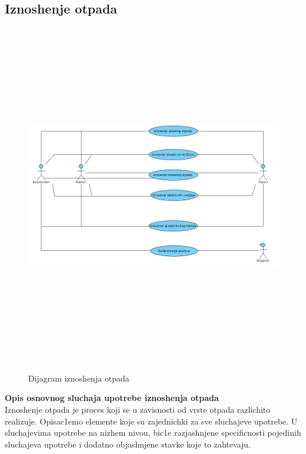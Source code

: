 \documentclass[10 pt]{article}
\begin{document}
	
	\subsection{Iznoshenje otpada}
	
	\begin{figure}[H]
		\centering
		\includegraphics[width=15cm,height=15cm,keepaspectratio]{slike/UCIznosenjeSmeca.png}\\
		\caption{Dijagram iznoshenja otpada}
	\end{figure}
	
	\textbf{Opis osnovnog sluchaja upotrebe iznoshenja otpada}\\
		
	Iznoshenje otpada je proces koji se u zavisnosti od vrste otpada razlichito realizuje.
	Opisac1emo elemente koje su zajednichki za sve sluchajeve upotrebe.
	U sluchajevima upotrebe na nizhem nivou, bic1e razjashnjene specificnosti
	pojedinih sluchajeva upotrebe i dodatno objashnjene stavke koje to zahtevaju.
	
\end{document}

